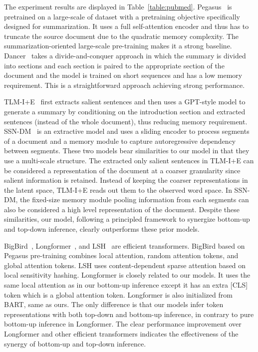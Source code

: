 The experiment results are displayed in Table~\ref{table:pubmed}. Pegasus~\citep{zhang2020pegasus} is pretrained on a large-scale of dataset with a pretraining objective specifically designed for summarization. It uses a full self-attention encoder and thus has to truncate the source document due to the quadratic memory complexity. The summarization-oriented large-scale pre-training makes it a strong baseline. Dancer~\citep{gidiotis2020divide} takes a divide-and-conquer approach in which the summary is divided into sections and each section is paired to the appropriate section of the document and the model is trained on short sequences and has a low memory requirement. This is a straightforward approach achieving strong performance.

TLM-I+E~\citep{pilault-etal-2020-extractive} first extracts salient sentences and then uses a GPT-style model to generate a summary by conditioning on the introduction section and extracted sentences (instead of the whole document), thus reducing memory requirement. SSN-DM~\citep{cui-hu-2021-sliding} is an extractive model and uses a sliding encoder to process segments of a document and a memory module to capture autoregressive dependency between segments. These two models bear similarities to our model in that they use a multi-scale structure. The extracted only salient sentences in TLM-I+E can be considered a representation of the document at a coarser granularity since salient information is retained. Instead of keeping the coarser representations in the latent space, TLM-I+E reads out them to the observed word space. In SSN-DM, the fixed-size memory module pooling information from each segments can also be considered a high level representation of the document. Despite these similarities, our model, following a principled framework to synergize bottom-up and top-down inference, clearly outperforms these prior models.  

BigBird~\citep{zaheer2020big}, Longformer~\citep{beltagy2020longformer}, and LSH~\citep{kitaev2020reformer, huang-etal-2021-efficient} are efficient transformers. BigBird based on Pegasus pre-training combines local attention, random attention tokens, and global attention tokens. LSH uses content-dependent sparse attention based on local sensitivity hashing. Longformer is closely related to our models. It uses the same local attention as in our bottom-up inference except it has an extra [CLS] token which is a global attention token. Longformer is also initialized from BART, same as ours. The only difference is that our models infer token representations with both top-down and bottom-up inference, in contrary to pure bottom-up inference in Longformer. The clear performance improvement over Longformer and other efficient transformers indicates the effectiveness of the synergy of bottom-up and top-down inference.   

